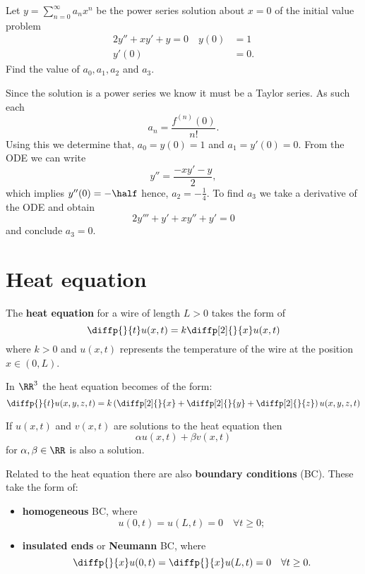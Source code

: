 \documentclass[12pt, a4paper]{article}
\begin{document}
\begin{mdexample}
    Let \(y = \sum_{n=0}^{\infty} a_n x^n\) be the power series solution about \(x=0\) of the initial value problem 
    \[\begin{aligned}
        2y''+xy'+y=0 \quad y(0) &= 1 \\
        y'(0) &=0.
    \end{aligned}\]
    Find the value of \(a_0,a_1,a_2\) and \(a_3\). 
    \begin{solution}
        Since the solution is a power series we know it must be a Taylor series. As such each 
        \[a_n = \frac{f^{(n)}(0)}{n!}.\]
        Using this we determine that, \(a_0 = y(0)=1\) and \(a_1=y'(0)=0\). From the ODE we can write 
        \[y''=\frac{-xy'-y}{2},\]
        which implies \(y''(0)=-\half\) hence, \(a_2 = -\frac{1}{4}\). To find \(a_3\) we take a derivative of the ODE and obtain 
        \[2y'''+y'+xy''+y'=0\]
        and conclude \(a_3=0\).
    \end{solution}
\end{mdexample}

\section{Heat equation}

\begin{definition}
    The \textbf{heat equation} for a wire of length \(L>0\) takes the form of 
    \[\diffp{}{t}u(x,t)=k\diffp[2]{}{x}u(x,t)\]
    where \(k>0\) and \(u(x,t)\) represents the temperature of the wire at the position \(x \in (0,L)\).
\end{definition}

\begin{mdremark}
    In \(\RR^3\) the heat equation becomes of the form:
    \[\diffp{}{t}u(x,y,z,t)=k\left( \diffp[2]{}{x}+\diffp[2]{}{y}+\diffp[2]{}{z} \right)u(x,y,z,t)\]
\end{mdremark}

\begin{theorem}
    If \(u(x,t)\) and \(v(x,t)\) are solutions to the heat equation then 
    \[\alpha u(x,t)+\beta v(x,t)\]
    for \(\alpha,\beta \in \RR\) is also a solution.
\end{theorem}

\begin{definition}
    Related to the heat equation there are also \textbf{boundary conditions} (BC). These take the form of:
    \begin{itemize}
        \item \textbf{homogeneous} BC, where 
        \[u(0,t)=u(L,t)=0 \quad \forall t\geq 0;\]
        \item \textbf{insulated ends} or \textbf{Neumann} BC, where 
        \[\diffp{}{x}u(0,t)=\diffp{}{x}u(L,t)=0 \quad \forall t\geq 0.\]
    \end{itemize}
\end{definition}
\end{document}
